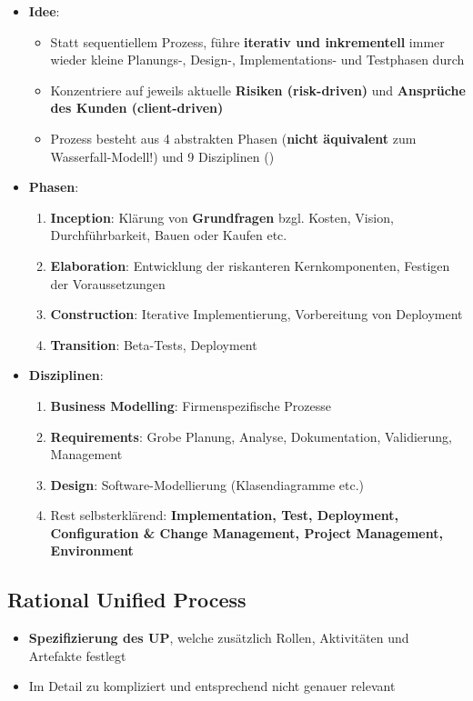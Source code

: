 \begin{itemize}
	\item \textbf{Idee}:
	\begin{itemize}
		\item Statt sequentiellem Prozess, führe \textbf{iterativ und inkrementell} immer wieder kleine Planungs-, Design-, Implementations- und Testphasen durch
		\item Konzentriere auf jeweils aktuelle \textbf{Risiken (risk-driven)} und \textbf{Ansprüche des Kunden (client-driven)}
		\item Prozess besteht aus 4 abstrakten Phasen (\textbf{nicht äquivalent} zum Wasserfall-Modell!) und 9 Disziplinen ()
	\end{itemize}
	\item \textbf{Phasen}:
	\begin{enumerate}
		\item \textbf{Inception}: Klärung von \textbf{Grundfragen} bzgl. Kosten, Vision, Durchführbarkeit, Bauen oder Kaufen etc.
		\item \textbf{Elaboration}: Entwicklung der riskanteren Kernkomponenten, Festigen der Voraussetzungen
		\item \textbf{Construction}: Iterative Implementierung, Vorbereitung von Deployment
		\item \textbf{Transition}: Beta-Tests, Deployment
	\end{enumerate}
	\item \textbf{Disziplinen}:
	\begin{enumerate}
		\item \textbf{Business Modelling}: Firmenspezifische Prozesse
		\item \textbf{Requirements}: Grobe Planung, Analyse, Dokumentation, Validierung, Management
		\item \textbf{Design}: Software-Modellierung (Klasendiagramme etc.)
		\item Rest selbsterklärend: \textbf{Implementation, Test, Deployment, Configuration \& Change Management, Project Management, Environment}
	\end{enumerate}
\end{itemize}

\subsection{Rational Unified Process}
\label{sdp:sub:rational_unified_process}

\begin{itemize}
	\item \textbf{Spezifizierung des UP}, welche zusätzlich Rollen, Aktivitäten und Artefakte festlegt
	\item Im Detail zu kompliziert und entsprechend nicht genauer relevant
\end{itemize}